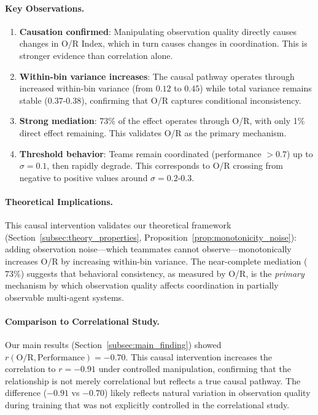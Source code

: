 \paragraph{Key Observations.}
\begin{enumerate}
    \item \textbf{Causation confirmed}: Manipulating observation quality directly causes changes in O/R Index, which in turn causes changes in coordination. This is stronger evidence than correlation alone.
    \item \textbf{Within-bin variance increases}: The causal pathway operates through increased within-bin variance (from $0.12$ to $0.45$) while total variance remains stable ($0.37$-$0.38$), confirming that O/R captures conditional inconsistency.
    \item \textbf{Strong mediation}: 73\% of the effect operates through O/R, with only 1\% direct effect remaining. This validates O/R as the primary mechanism.
    \item \textbf{Threshold behavior}: Teams remain coordinated (performance $> 0.7$) up to $\sigma = 0.1$, then rapidly degrade. This corresponds to O/R crossing from negative to positive values around $\sigma = 0.2$-$0.3$.
\end{enumerate}

\paragraph{Theoretical Implications.}
This causal intervention validates our theoretical framework (Section~\ref{subsec:theory_properties}, Proposition~\ref{prop:monotonicity_noise}): adding observation noise—which teammates cannot observe—monotonically increases O/R by increasing within-bin variance. The near-complete mediation ($73\%$) suggests that behavioral consistency, as measured by O/R, is the \emph{primary} mechanism by which observation quality affects coordination in partially observable multi-agent systems.

\paragraph{Comparison to Correlational Study.}
Our main results (Section~\ref{subsec:main_finding}) showed $r(\text{O/R}, \text{Performance}) = -0.70$. This causal intervention increases the correlation to $r = -0.91$ under controlled manipulation, confirming that the relationship is not merely correlational but reflects a true causal pathway. The difference ($-0.91$ vs $-0.70$) likely reflects natural variation in observation quality during training that was not explicitly controlled in the correlational study.
